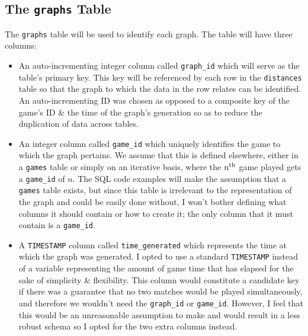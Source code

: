 \documentclass[a4paper,11pt]{article}
\begin{document}
\subsection{The \texttt{graphs} Table}
The \texttt{graphs} table will be used to identify each graph. 
The table will have three columns:
\begin{itemize}
    \item   An auto-incrementing integer column called \texttt{graph_id} which will serve as the table's primary key. 
            This key will be referenced by each row in the \texttt{distances} table so that the graph to which the data in the row relates can be identified.
            An auto-incrementing ID was chosen as opposed to a composite key of the game's ID \& the time of the graph's generation so as to reduce the duplication of data across tables.

    \item   An integer column called \texttt{game_id} which uniquely identifies the game to which the graph pertains.
            We assume that this is defined elsewhere, either in a \texttt{games} table or simply on an iterative basis, where the $n\textsuperscript{th}$ game played gets a
            \texttt{game_id} of $n$.
            The SQL code examples will make the assumption that a \texttt{games} table exists, but since this table is irrelevant to the representation of the graph and could be easily done 
            without, I won't bother defining what columns it should contain or how to create it; the only column that it must contain is a \texttt{game_id}.
    
    \item   A \texttt{TIMESTAMP} column called \texttt{time_generated} which represents the time at which the graph was generated. 
            I opted to use a standard \texttt{TIMESTAMP} instead of a variable representing the amount of game time that has elapsed for the sake of simplicity \& flexibility.
            This column would constitute a candidate key if there was a guarantee that no two matches would be played simultaneously, and therefore we wouldn't need the \texttt{graph_id} or 
            \texttt{game_id}. 
            However, I feel that this would be an unreasonable assumption to make and would result in a less robust schema so I opted for the two extra columns instead.
\end{itemize}
\end{document}
